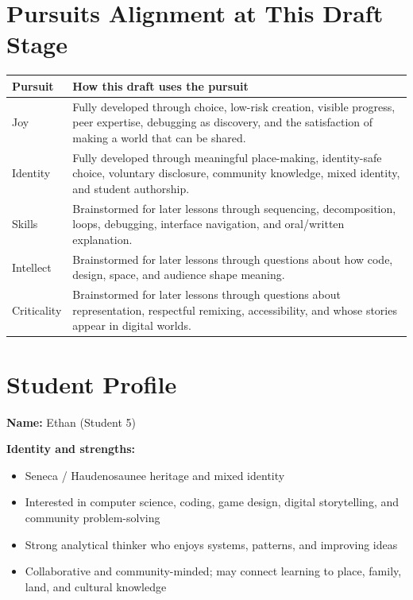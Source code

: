\documentclass[11pt]{article}
\begin{document}
\section*{Pursuits Alignment at This Draft Stage}

\begin{tabularx}{\textwidth}{>{\raggedright\arraybackslash}p{}Y}
\toprule
\textbf{Pursuit} & \textbf{How this draft uses the pursuit} \\
\midrule
Joy & Fully developed through choice, low-risk creation, visible progress, peer expertise, debugging as discovery, and the satisfaction of making a world that can be shared. \\
Identity & Fully developed through meaningful place-making, identity-safe choice, voluntary disclosure, community knowledge, mixed identity, and student authorship. \\
Skills & Brainstormed for later lessons through sequencing, decomposition, loops, debugging, interface navigation, and oral/written explanation. \\
Intellect & Brainstormed for later lessons through questions about how code, design, space, and audience shape meaning. \\
Criticality & Brainstormed for later lessons through questions about representation, respectful remixing, accessibility, and whose stories appear in digital worlds. \\
\bottomrule
\end{tabularx}

\section*{Student Profile}

\textbf{Name:} Ethan (Student 5)

\textbf{Identity and strengths:}
\begin{itemize}[leftmargin=*]
    \item Seneca / Haudenosaunee heritage and mixed identity
    \item Interested in computer science, coding, game design, digital storytelling, and community problem-solving
    \item Strong analytical thinker who enjoys systems, patterns, and improving ideas
    \item Collaborative and community-minded; may connect learning to place, family, land, and cultural knowledge
\end{itemize}
\end{document}
